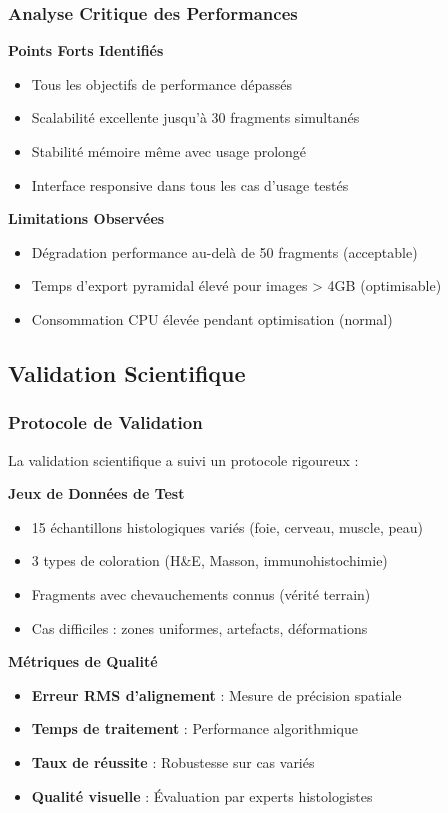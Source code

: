 \documentclass[12pt,a4paper]{report}
\begin{document}
\subsubsection{Analyse Critique des Performances}

\textbf{Points Forts Identifiés}
\begin{itemize}
\item Tous les objectifs de performance dépassés
\item Scalabilité excellente jusqu'à 30 fragments simultanés
\item Stabilité mémoire même avec usage prolongé
\item Interface responsive dans tous les cas d'usage testés
\end{itemize}

\textbf{Limitations Observées}
\begin{itemize}
\item Dégradation performance au-delà de 50 fragments (acceptable)
\item Temps d'export pyramidal élevé pour images > 4GB (optimisable)
\item Consommation CPU élevée pendant optimisation (normal)
\end{itemize}

\subsection{Validation Scientifique}

\subsubsection{Protocole de Validation}

La validation scientifique a suivi un protocole rigoureux :

\textbf{Jeux de Données de Test}
\begin{itemize}
\item 15 échantillons histologiques variés (foie, cerveau, muscle, peau)
\item 3 types de coloration (H\&E, Masson, immunohistochimie)
\item Fragments avec chevauchements connus (vérité terrain)
\item Cas difficiles : zones uniformes, artefacts, déformations
\end{itemize}

\textbf{Métriques de Qualité}
\begin{itemize}
\item \textbf{Erreur RMS d'alignement} : Mesure de précision spatiale
\item \textbf{Temps de traitement} : Performance algorithmique
\item \textbf{Taux de réussite} : Robustesse sur cas variés
\item \textbf{Qualité visuelle} : Évaluation par experts histologistes
\end{itemize}
\end{document}
